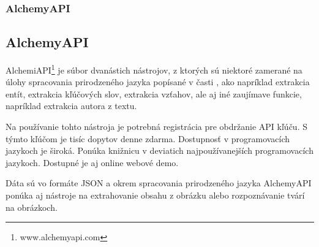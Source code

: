 %
%
{
	\subsubsection{AlchemyAPI}
}
{
	\subsection{AlchemyAPI}
}
\label{subsubsec:alchemyapi}
AlchemiAPI\footnote{www.alchemyapi.com} je súbor dvanástich nástrojov, z ktorých sú niektoré zamerané na úlohy spracovania prirodzeného jazyka popísané v časti , ako napríklad extrakcia entít, extrakcia kľúčových slov, extrakcia vzťahov, ale aj iné zaujímave funkcie, napríklad extrakcia autora z textu.

Na používanie tohto nástroja je potrebná registrácia pre obdržanie API kľúču. S týmto kľúčom je tisíc dopytov denne zdarma. Dostupnosť v programovacích jazykoch je široká. Ponúka knižnicu v deviatich najpoužívanejších programovacích jazykoch. Dostupné je aj online webové demo.



Dáta sú vo formáte JSON a okrem spracovania prirodzeného jazyka AlchemyAPI ponúka aj nástroje na extrahovanie obsahu z obrázku alebo rozpoznávanie tvárí na obrázkoch.

